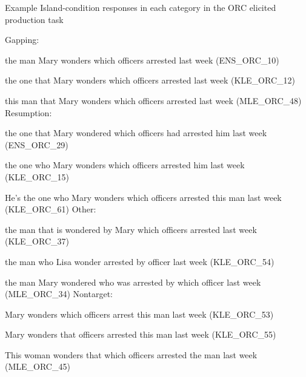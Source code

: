 \pex Example Island-condition responses in each category in the ORC elicited production task \label{ex-ept-sample-orc}\par\nobreak
\a Gapping: \par\nobreak\vspace{5pt}
the man Mary wonders which officers arrested last week (ENS\_ORC\_10) \par\nobreak
the one that Mary wonders which officers arrested last week (KLE\_ORC\_12) \par\nobreak
this man that Mary wonders which officers arrested last week (MLE\_ORC\_48)
\a Resumption: \par\nobreak\vspace{5pt}
the one that Mary wondered which officers had arrested him last week (ENS\_ORC\_29) \par\nobreak 
the one who Mary wonders which officers arrested him last week (KLE\_ORC\_15) \par\nobreak 
He's the one who Mary wonders which officers arrested this man last week (KLE\_ORC\_61) 
\a Other: \par\nobreak\vspace{5pt}
the man that is wondered by Mary which officers arrested last week (KLE\_ORC\_37) \par\nobreak 
the man who Lisa wonder arrested by officer last week (KLE\_ORC\_54) \par\nobreak 
the man Mary wondered who was arrested by which officer last week (MLE\_ORC\_34)
\a Nontarget: \par\nobreak\vspace{5pt}
Mary wonders which officers arrest this man last week (KLE\_ORC\_53) \par\nobreak 
Mary wonders that officers arrested this man last week (KLE\_ORC\_55) \par\nobreak 
This woman wonders that which officers arrested the man last week (MLE\_ORC\_45)
\xe 

